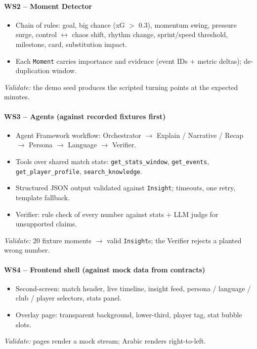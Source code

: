 \documentclass[11pt,a4paper]{article}
\begin{document}
\paragraph{WS2 -- Moment Detector}
\begin{itemize}
  \item Chain of rules: goal, big chance (xG $>$ 0.3), momentum swing, pressure surge, control $\leftrightarrow$ chaos shift,
        rhythm change, sprint/speed threshold, milestone, card, substitution impact.
  \item Each \texttt{Moment} carries importance and evidence (event IDs + metric deltas); de-duplication window.
\end{itemize}
\textit{Validate:} the demo seed produces the scripted turning points at the expected minutes.

\paragraph{WS3 -- Agents (against recorded fixtures first)}
\begin{itemize}
  \item Agent Framework workflow: Orchestrator $\rightarrow$ Explain / Narrative / Recap $\rightarrow$ Persona $\rightarrow$ Language $\rightarrow$ Verifier.
  \item Tools over shared match state: \texttt{get\_stats\_window}, \texttt{get\_events}, \texttt{get\_player\_profile}, \texttt{search\_knowledge}.
  \item Structured JSON output validated against \texttt{Insight}; timeouts, one retry, template fallback.
  \item Verifier: rule check of every number against stats + LLM judge for unsupported claims.
\end{itemize}
\textit{Validate:} 20 fixture moments $\rightarrow$ valid \texttt{Insight}s; the Verifier rejects a planted wrong number.

\paragraph{WS4 -- Frontend shell (against mock data from contracts)}
\begin{itemize}
  \item Second-screen: match header, live timeline, insight feed, persona / language / club / player selectors, stats panel.
  \item Overlay page: transparent background, lower-third, player tag, stat bubble slots.
\end{itemize}
\textit{Validate:} pages render a mock stream; Arabic renders right-to-left.
\end{document}
